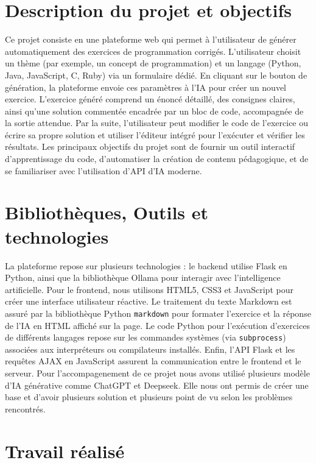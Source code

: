 \documentclass[a4paper, 12pt, twoside]{article}
\begin{document}
\section{Description du projet et objectifs}

Ce projet consiste en une plateforme web qui permet à l'utilisateur de générer automatiquement des exercices de programmation corrigés. L'utilisateur choisit un thème (par exemple, un concept de programmation) et un langage (Python, Java, JavaScript, C, Ruby) via un formulaire dédié. En cliquant sur le bouton de génération, la plateforme envoie ces paramètres à l'IA pour créer un nouvel exercice. L'exercice généré comprend un énoncé détaillé, des consignes claires, ainsi qu'une solution commentée encadrée par un bloc de code, accompagnée de la sortie attendue. Par la suite, l'utilisateur peut modifier le code de l'exercice ou écrire sa propre solution et utiliser l'éditeur intégré pour l'exécuter et vérifier les résultats. Les principaux objectifs du projet sont de fournir un outil interactif d'apprentissage du code, d'automatiser la création de contenu pédagogique, et de se familiariser avec l'utilisation d'API d'IA moderne.

\section{Bibliothèques, Outils et technologies}

La plateforme repose sur plusieurs technologies : le backend utilise Flask en Python, ainsi que la bibliothèque Ollama pour interagir avec l'intelligence artificielle. Pour le frontend, nous utilisons HTML5, CSS3 et JavaScript pour créer une interface utilisateur réactive. Le traitement du texte Markdown est assuré par la bibliothèque Python \texttt{markdown} pour formater l'exercice et la réponse de l'IA en HTML affiché sur la page. Le code Python pour l'exécution d'exercices de différents langages repose sur les commandes systèmes (via \texttt{subprocess}) associées aux interpréteurs ou compilateurs installés. Enfin, l'API Flask et les requêtes AJAX en JavaScript assurent la communication entre le frontend et le serveur. Pour l’accompagenement de ce projet nous avons utilisé plusieurs modèle d’IA générative comme ChatGPT et Deepseek. Elle nous ont permis de créer une base et d’avoir plusieurs solution et plusieurs point de vu selon les problèmes rencontrés.

\section{Travail réalisé}
\end{document}

